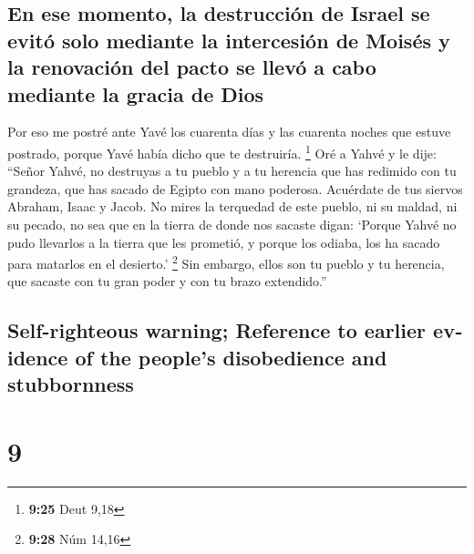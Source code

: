 \begin{paracol}{2}
\hypertarget{en-ese-momento-la-destrucciuxf3n-de-israel-se-evituxf3-solo-mediante-la-intercesiuxf3n-de-moisuxe9s-y-la-renovaciuxf3n-del-pacto-se-llevuxf3-a-cabo-mediante-la-gracia-de-dios}{%
\subsection{En ese momento, la destrucción de Israel se evitó solo
mediante la intercesión de Moisés y la renovación del pacto se llevó a
cabo mediante la gracia de
Dios}\label{en-ese-momento-la-destrucciuxf3n-de-israel-se-evituxf3-solo-mediante-la-intercesiuxf3n-de-moisuxe9s-y-la-renovaciuxf3n-del-pacto-se-llevuxf3-a-cabo-mediante-la-gracia-de-dios}}

 Por eso me postré ante Yavé los cuarenta días y las
cuarenta noches que estuve postrado, porque Yavé había dicho que te
destruiría. \footnote{\textbf{9:25} Deut 9,18}  Oré a
Yahvé y le dije: ``Señor Yahvé, no destruyas a tu pueblo y a tu herencia
que has redimido con tu grandeza, que has sacado de Egipto con mano
poderosa.  Acuérdate de tus siervos Abraham, Isaac y
Jacob. No mires la terquedad de este pueblo, ni su maldad, ni su pecado,
 no sea que en la tierra de donde nos sacaste digan:
`Porque Yahvé no pudo llevarlos a la tierra que les prometió, y porque
los odiaba, los ha sacado para matarlos en el desierto.' \footnote{\textbf{9:28}
  Núm 14,16}  Sin embargo, ellos son tu pueblo y tu
herencia, que sacaste con tu gran poder y con tu brazo extendido.''

\switchcolumn
\begin{otherlanguage}{english}

\hypertarget{self-righteous-warning-reference-to-earlier-evidence-of-the-peoples-disobedience-and-stubbornness}{%
\subsection{Self-righteous warning; Reference to earlier evidence of the
people's disobedience and
stubbornness}\label{self-righteous-warning-reference-to-earlier-evidence-of-the-peoples-disobedience-and-stubbornness}}

\hypertarget{section-17}{%
\section{9}\label{section-17}}


\end{otherlanguage}
\end{paracol}
